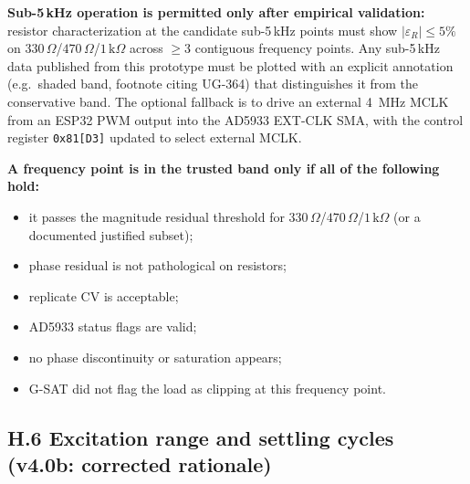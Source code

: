 \documentclass[11pt,a4paper]{article}
\newcommand{\kohm}[1]{\ensuremath{#1\,\mathrm{k}\Omega}}
\newcommand{\Rohm}[1]{\ensuremath{#1\,\Omega}}
\begin{document}
\textbf{Sub-5\,kHz operation is permitted only after empirical validation:} resistor characterization at the candidate sub-5\,kHz points must show $|\varepsilon_R| \leq 5\%$ on \Rohm{330}/\Rohm{470}/\kohm{1} across $\geq 3$ contiguous frequency points. Any sub-5\,kHz data published from this prototype must be plotted with an explicit annotation (e.g.\ shaded band, footnote citing UG-364) that distinguishes it from the conservative band. The optional fallback is to drive an external \SI{4}{\mega\hertz} MCLK from an ESP32 PWM output into the AD5933 EXT-CLK SMA, with the control register \texttt{0x81[D3]} updated to select external MCLK.

\textbf{A frequency point is in the trusted band only if all of the following hold:}
\begin{itemize}
\item it passes the magnitude residual threshold for \Rohm{330}/\Rohm{470}/\kohm{1} (or a documented justified subset);
\item phase residual is not pathological on resistors;
\item replicate CV is acceptable;
\item AD5933 status flags are valid;
\item no phase discontinuity or saturation appears;
\item G-SAT did not flag the load as clipping at this frequency point.
\end{itemize}

\subsection{H.6 Excitation range and settling cycles (v4.0b: corrected rationale)}
\end{document}

